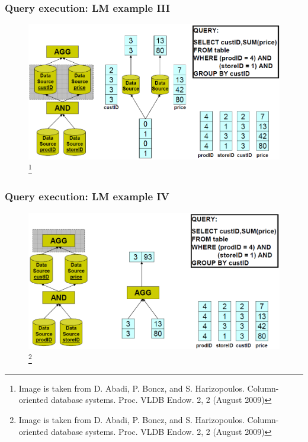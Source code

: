 \documentclass[compress, dvipsnames, unicode]{beamer}
\begin{document}
\begin{frame}
\frametitle{Query execution: LM example III}

\begin{figure}[htb]
\includegraphics[width=\textwidth,height=0.75\textheight,keepaspectratio]{lm3.png} 
\footnote{\tiny{Image is taken from D. Abadi, P. Boncz, and S. Harizopoulos. Column-oriented database systems. Proc. VLDB Endow. 2, 2 (August 2009)}}
\end{figure}    

\end{frame}

\begin{frame}
\frametitle{Query execution: LM example IV}

\begin{figure}[htb]
\includegraphics[width=\textwidth,height=0.75\textheight,keepaspectratio]{lm4.png} 
\footnote{\tiny{Image is taken from D. Abadi, P. Boncz, and S. Harizopoulos. Column-oriented database systems. Proc. VLDB Endow. 2, 2 (August 2009)}}
\end{figure}    

\end{frame}
\end{document}
